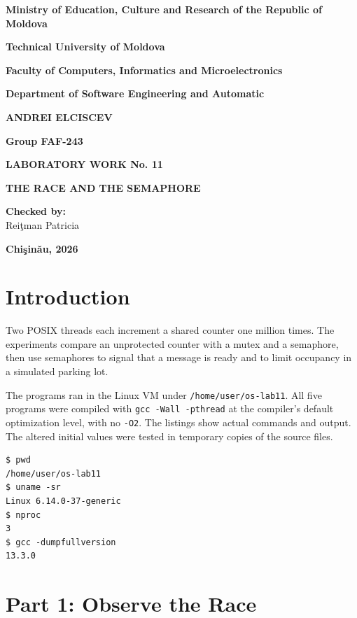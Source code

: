 \documentclass[12pt,a4paper]{article}
\begin{document}
\begin{titlepage}
\centering
\textbf{Ministry of Education, Culture and Research of the Republic of Moldova}\par\medskip
\textbf{Technical University of Moldova}\par\medskip
\textbf{Faculty of Computers, Informatics and Microelectronics}\par\medskip
\textbf{Department of Software Engineering and Automatic}\par
\vspace{2.5cm}
\textbf{ANDREI ELCISCEV}\par
\textbf{Group FAF-243}\par
\vspace{2cm}
{\Large\textbf{LABORATORY WORK No. 11}\par}
\medskip
{\Large\textbf{THE RACE AND THE SEMAPHORE}\par}
\vspace{2cm}
\begin{flushright}
\textbf{Checked by:}\\
Rei\c{t}man Patricia
\end{flushright}
\vfill
\textbf{Chi\c{s}in\u{a}u, 2026}
\end{titlepage}
\tableofcontents
\newpage
\section{Introduction}
Two POSIX threads each increment a shared counter one million times. The experiments
compare an unprotected counter with a mutex and a semaphore, then use semaphores to
signal that a message is ready and to limit occupancy in a simulated parking lot.

The programs ran in the Linux VM under \texttt{/home/user/os-lab11}. All five programs
were compiled with \texttt{gcc -Wall -pthread} at the compiler's default optimization
level, with no \texttt{-O2}. The listings show actual commands and output. The altered
initial values were tested in temporary copies of the source files.

\begin{lstlisting}[caption={Linux VM and compiler}]
$ pwd
/home/user/os-lab11
$ uname -sr
Linux 6.14.0-37-generic
$ nproc
3
$ gcc -dumpfullversion
13.3.0
\end{lstlisting}

\section{Part 1: Observe the Race}
\end{document}
